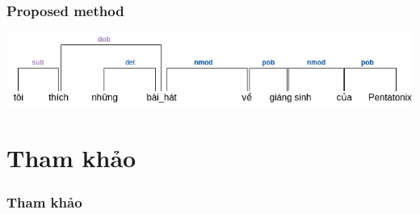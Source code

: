 \documentclass{beamer}
\begin{document}
\begin{frame}
	\frametitle{Proposed method}
			
	\begin{center} 
		\centering 
			\includegraphics[width=\textwidth,height=\textheight,keepaspectratio]{qa_first_ex} 			
			\vspace{0.5cm} 
	\end{center}		
		
\end{frame}
	
\section{Tham khảo}
\begin{frame}
	\frametitle{Tham khảo}
	\printbibliography
\end{frame}
	
	
	
	
	
	
	
\end{document}
